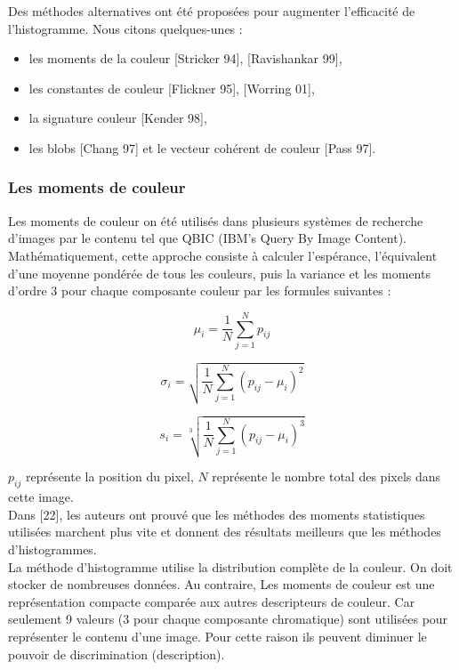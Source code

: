 Des méthodes alternatives ont été proposées pour augmenter l'efficacité de l'histogramme. Nous citons quelques-unes : 
\begin{itemize}
	\item les moments de la couleur [Stricker 94], [Ravishankar 99],
	\item les constantes de couleur [Flickner 95], [Worring 01],
	\item la signature couleur [Kender 98], 
	\item les blobs [Chang 97] et le vecteur cohérent de couleur [Pass 97].\\
\end{itemize}


\subsubsection{Les moments de couleur}
Les moments de couleur on été utilisés dans plusieurs systèmes de recherche d’images par le contenu tel que QBIC (IBM's Query By Image Content). Mathématiquement,
cette approche consiste à calculer l’espérance, l’équivalent d’une moyenne pondérée de tous les couleurs, puis la variance et les moments d’ordre 3
pour chaque composante couleur par les formules suivantes :

\begin{equation}
	\mu_i = \frac{1}{N} \sum_{j=1}^{N} p_{ij}
\end{equation}

\begin{equation}
	\sigma_i = \sqrt{\frac{1}{N} \sum_{j=1}^{N} (p_{ij}-\mu_i)^2}
\end{equation}

\begin{equation}
	s_i = \sqrt[3]{\frac{1}{N} \sum_{j=1}^{N} (p_{ij}-\mu_i)^3}
\end{equation}

$p_{ij}$ représente la position du pixel, $N$ représente le nombre total des pixels dans cette image.\\

Dans [22], les auteurs ont prouvé que les méthodes des moments statistiques utilisées marchent plus vite et donnent des résultats meilleurs que les méthodes d’histogrammes.\\


La méthode d'histogramme utilise la distribution complète de la couleur. On doit stocker de nombreuses données. Au contraire, Les moments de couleur est une représentation compacte comparée aux autres descripteurs de couleur. Car seulement 9 valeurs (3 pour chaque composante chromatique) sont utilisées pour représenter le contenu d'une image. Pour cette raison ils peuvent diminuer le pouvoir de discrimination (description). 

